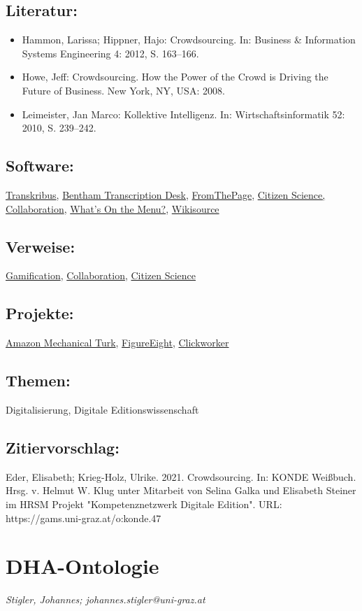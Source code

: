 \documentclass{article}
\begin{document}
        \subsection*{Literatur:}\begin{itemize}\item Hammon, Larissa; Hippner, Hajo: Crowdsourcing. In: Business & Information Systems Engineering 4: 2012, S. 163–166.\item Howe, Jeff: Crowdsourcing. How the Power of the Crowd is Driving the Future of Business. New York, NY, USA: 2008.\item Leimeister, Jan Marco: Kollektive Intelligenz. In: Wirtschaftsinformatik 52: 2010, S. 239–242.\end{itemize}\subsection*{Software:}\href{https://transkribus.eu/Transkribus/}{Transkribus}, \href{http://transcribe-bentham.ucl.ac.uk/td/Transcribe_Bentham}{Bentham Transcription Desk}, \href{https://fromthepage.com/}{FromThePage}, \href{https://islandora.ca/}{Citizen Science, Collaboration}, \href{http://menus.nypl.org/}{What's On the Menu?}, \href{http://en.wikisource.org/wiki/Main_Page}{Wikisource}\subsection*{Verweise:}\href{https://gams.uni-graz.at/o:konde.89}{Gamification}, \href{https://gams.uni-graz.at/o:konde.104}{Collaboration}, \href{https://gams.uni-graz.at/o:konde.41}{Citizen Science}\subsection*{Projekte:}\href{https://www.mturk.com/}{Amazon Mechanical Turk}, \href{https://www.figure-eight.com/}{FigureEight}, \href{https://www.clickworker.de/}{Clickworker}\subsection*{Themen:}Digitalisierung, Digitale Editionswissenschaft\subsection*{Zitiervorschlag:}Eder, Elisabeth; Krieg-Holz, Ulrike. 2021. Crowdsourcing. In: KONDE Weißbuch. Hrsg. v. Helmut W. Klug unter Mitarbeit von Selina Galka und Elisabeth Steiner im HRSM Projekt "Kompetenznetzwerk Digitale Edition". URL: https://gams.uni-graz.at/o:konde.47\newpage\section*{DHA-Ontologie} \emph{Stigler, Johannes; johannes.stigler@uni-graz.at }\\
        
\end{document}
